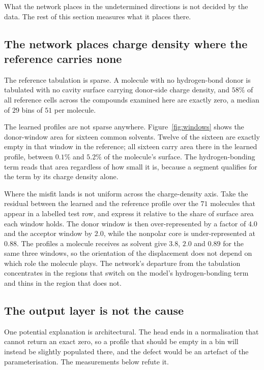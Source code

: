 What the network places in the undetermined directions is not decided by the data. The rest of
this section measures what it places there.

\subsection{The network places charge density where the reference carries none}
\label{sec:windows}

The reference tabulation is sparse. A molecule with no hydrogen-bond donor is tabulated with no
cavity surface carrying donor-side charge density, and $58\%$ of all reference cells across the
compounds examined here are exactly zero, a median of $29$ bins of $51$ per molecule.

The learned profiles are not sparse anywhere. Figure~\ref{fig:windows} shows the donor-window area
for sixteen common solvents. Twelve of the sixteen are exactly empty in that window in the
reference; all sixteen carry area there in the learned profile, between $0.1\%$ and $5.2\%$ of the
molecule's surface. The hydrogen-bonding term reads that area regardless of how small it is,
because a segment qualifies for the term by its charge density alone.

Where the misfit lands is not uniform across the charge-density axis. Take the residual between
the learned and the reference profile over the $71$ molecules that appear in a labelled test row,
and express it relative to the share of surface area each window holds. The donor window is then
over-represented by a factor of $4.0$ and the acceptor window by $2.0$, while the nonpolar core is
under-represented at $0.88$. The profiles a molecule receives as solvent give $3.8$, $2.0$ and
$0.89$ for the same three windows, so the orientation of the displacement does not depend on which
role the molecule plays. The network's departure from the tabulation concentrates in the regions
that switch on the model's hydrogen-bonding term and thins in the region that does not.

\subsection{The output layer is not the cause}
\label{sec:pedestal}

One potential explanation is architectural. The head ends in a normalisation that cannot return an
exact zero, so a profile that should be empty in a bin will instead be slightly populated there,
and the defect would be an artefact of the parameterisation. The measurements below refute it.

